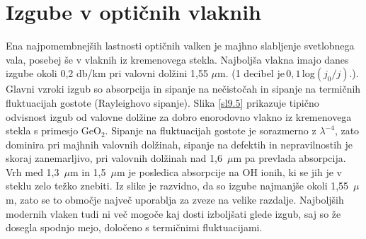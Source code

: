 % 
% 


\section{Izgube v optičnih vlaknih}
Ena najpomembnejših lastnosti optičnih valken je majhno slabljenje
svetlobnega vala, posebej še v vlaknih iz kremenovega stekla. Najboljša
vlakna imajo danes izgube okoli 0,2 db/km pri valovni dolžini 1,55
$\mu$m. (1 decibel je$\,0,1\,$log$(j_{0}/j).$). Glavni vzroki izgub
so absorpcija in sipanje na nečistočah in sipanje na termičnih fluktuacijah
gostote (Rayleighovo sipanje). Slika \ref{sl9.5} prikazuje tipično
odvisnost izgub od valovne dolžine za dobro enorodovno vlakno iz kremenovega
stekla s primesjo GeO$_{2}.$ Sipanje na fluktuacijah gostote je sorazmerno
z $\lambda^{-4}$, zato dominira pri majhnih valovnih dolžinah, sipanje
na defektih in nepravilnostih je skoraj zanemarljivo, pri valovnih
dolžinah nad 1,6~$\mu$m pa prevlada absorpcija. Vrh med 1,3~$\mu$m
in 1,5~$\mu$m je posledica absorpcije na OH ionih, ki se jih je
v steklu zelo težko znebiti. Iz slike je razvidno, da so izgube najmanjše
okoli 1,55~$\mu$m, zato se to območje največ uporablja za zveze
na velike razdalje. Najboljših modernih vlaken tudi ni več mogoče
kaj dosti izboljšati glede izgub, saj so že dosegla spodnjo mejo,
določeno s termičnimi fluktuacijami.

